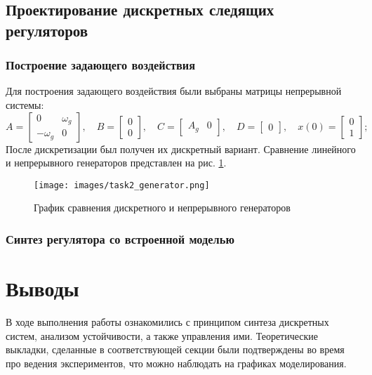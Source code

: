 \documentclass[a4paper, 14pt]{extarticle}
\theoremstyle{definition}
\theoremstyle{plain}
\theoremstyle{remark}
\begin{document}
\subsection{Проектирование дискретных следящих регуляторов}
\subsubsection{Построение задающего воздействия}
Для построения задающего воздействия были выбраны матрицы непрерывной системы:
\[
	A = \begin{bmatrix} 0 & \omega_g \\ -\omega_g & 0 \end{bmatrix}, \quad
	B = \begin{bmatrix} 0 \\ 0 \end{bmatrix}, \quad
	C = \begin{bmatrix} A_g & 0 \end{bmatrix}, \quad
	D = \begin{bmatrix} 0 \end{bmatrix}, \quad
	x(0) = \begin{bmatrix} 0 \\ 1 \end{bmatrix};
\]
После дискретизации был получен их дискретный вариант. Сравнение линейного и непрерывного генераторов представлен на рис. \ref{fig:task2_gen}.
\begin{figure}
	[H]
	\centering
	\texttt{[image: images/task2\_generator.png]}
	\caption{График сравнения дискретного и непрерывного генераторов}
	\label{fig:task2_gen}
\end{figure}
\subsubsection{Синтез регулятора со встроенной моделью}

\newpage
\section{Выводы}
В ходе выполнения работы ознакомились с принципом синтеза дискретных систем, анализом устойчивости, а также управления ими. Теоретические выкладки, сделанные в соответствующей секции были подтверждены во время про ведения экспериментов, что можно наблюдать на графиках моделирования.
\end{document}
